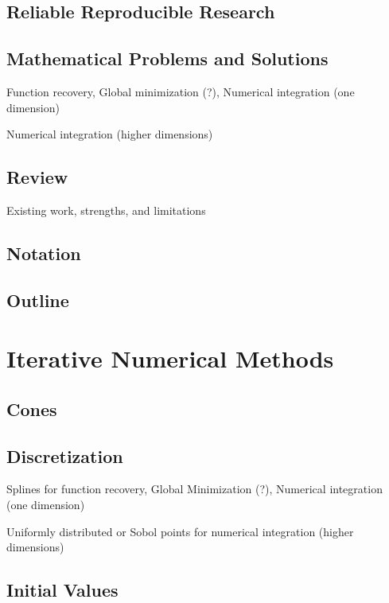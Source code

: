 \documentclass[acmtoms]{doc_acmtrans2m}%
\begin{document}
\subsection{Reliable Reproducible Research}

\subsection{Mathematical Problems and Solutions} \label{sec:prob}

Function recovery, Global minimization (?), Numerical integration (one dimension)

Numerical integration (higher dimensions)

\subsection{Review} \label{sec:lit}

Existing work, strengths, and limitations

\subsection{Notation} \label{sec:not}

\subsection{Outline} \label{sec:lit}

\section{Iterative Numerical Methods}
\label{sec:meth}

\subsection{Cones} \label{sec:cones}


\subsection{Discretization} \label{sec:dis}
Splines for function recovery, Global Minimization (?), Numerical integration (one dimension)

Uniformly distributed or Sobol points for numerical integration (higher dimensions)

\subsection{Initial Values}
\end{document}
